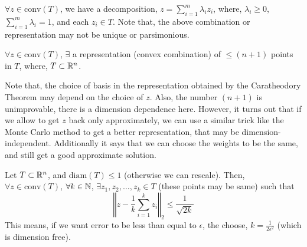 \documentclass[12pt]{article}
\begin{document}
\begin{theorembox}
    $\forall z \in \text{conv}(T)$, we have a decomposition, $z = \sum_{i=1}^m \lambda_i z_i$, where, $\lambda_i \geq 0$, $\sum_{i=1}^m \lambda_i = 1$, and each $z_i \in T$. Note that, the above combination or representation may not be unique or parsimonious.
\end{theorembox}

\begin{theorembox}
    $\forall z \in \text{conv}(T)$, $\exists$ a representation (convex combination) of $\leq (n+1)$ points in $T$, where, $T \subset \mathbb{R}^n$.
\end{theorembox}

Note that, the choice of basis in the representation obtained by the Caratheodory Theorem may depend on the choice of $z$. Also, the number $(n+1)$ is unimprovable, there is a dimension dependence here. However, it turns out that if we allow to get $z$ back only approximately, we can use a similar trick like the Monte Carlo method to get a better representation, that may be dimension-independent. Additionally it says that we can choose the weights to be the same, and still get a good approximate solution.

\begin{theorembox}
    Let $T \subset \mathbb{R}^n$, and $\text{diam}(T) \leq 1$ (otherwise we can rescale). Then, $\forall z \in \text{conv}(T)$, $\forall k \in \mathbb{N}$, $\exists z_1, z_2, \ldots, z_k \in T$ (these points may be same) such that
    \begin{equation*}
        \left\Vert z - \frac{1}{k} \sum_{i=1}^k z_i\right\Vert_2 \leq \frac{1}{\sqrt{2k}}
    \end{equation*}
    This means, if we want error to be less than equal to $\epsilon$, the choose, $k = \frac{1}{2\epsilon^2}$ (which is dimension free).
\end{theorembox}
\end{document}

